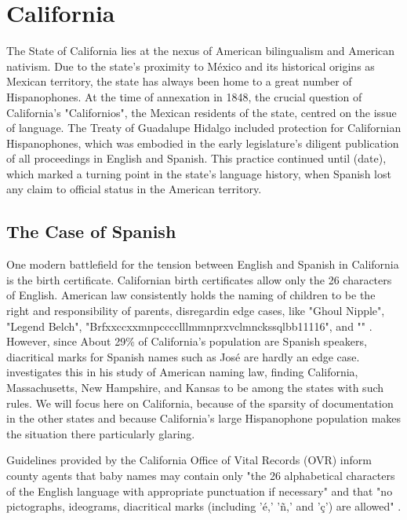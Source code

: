 \section{California}

The State of California lies at the nexus of American bilingualism and American
nativism.  Due to the state's proximity to México and its historical origins as
Mexican territory, the state has always been home to a great number of
Hispanophones. At the time of annexation in 1848, the crucial question of
California's "Californios", the Mexican residents of the state, centred on the
issue of language. The Treaty of Guadalupe Hidalgo included protection for
Californian Hispanophones, which was embodied in the early legislature's
diligent publication of all proceedings in English and Spanish. This practice
continued until (date), which marked a turning point in the state's language
history, when Spanish lost any claim to official status in the American
territory.


\subsection{The Case of Spanish}

One modern battlefield for the tension between English and Spanish in California
is the birth certificate. Californian birth certificates allow only the 26
characters of English. American law consistently holds the naming of children to
be the right and responsibility of parents, disregardin edge cases, like "Ghoul
Nipple", "Legend Belch", "Brfxxccxxmnpcccclllmmnprxvclmnckssqlbb11116", and ""
\parencite{larson11}.  However, since About 29\% of California's population are
Spanish speakers, diacritical marks for Spanish names such as José are hardly an
edge case. \textcite[5]{larson11} investigates this in his study of American
naming law, finding California, Massachusetts, New Hampshire, and Kansas to be
among the states with such rules. We will focus here on California, because of
the sparsity of documentation in the other states and because California's large
Hispanophone population makes the situation there particularly glaring.

\parencite{acs-lang-states} Guidelines provided by the California Office of
Vital Records (OVR) inform county agents that baby names may contain only "the
26 alphabetical characters of the English language with appropriate punctuation
if necessary" and that "no pictographs, ideograms, diacritical marks (including
'é,' 'ñ,' and 'ç') are allowed" \parencite{larson11}.

